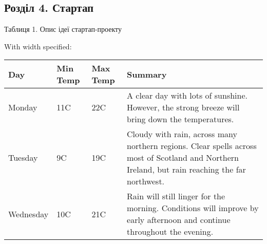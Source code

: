 \documentclass[14pt]{article}
\begin{document}
\subsection{Розділ 4. Стартап}
Таблиця 1. Опис ідеї стартап-проекту

With width specified:
\begin{center}
    \begin{tabular}{ | l | l | l | p{5cm} |}
    \hline
    Day & Min Temp & Max Temp & Summary \\ \hline
    Monday & 11C & 22C & A clear day with lots of sunshine.  
    However, the strong breeze will bring down the temperatures. \\ \hline
    Tuesday & 9C & 19C & Cloudy with rain, across many northern regions. Clear spells 
    across most of Scotland and Northern Ireland, 
    but rain reaching the far northwest. \\ \hline
    Wednesday & 10C & 21C & Rain will still linger for the morning. 
    Conditions will improve by early afternoon and continue 
    throughout the evening. \\
    \hline
    \end{tabular}
\end{center}
\end{document}

